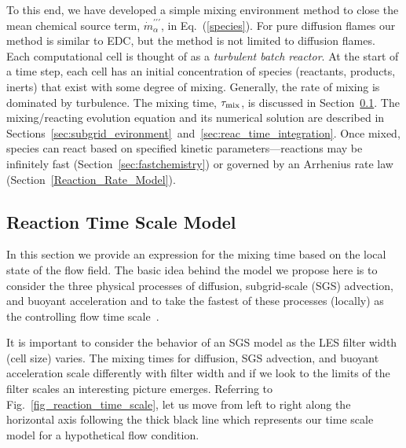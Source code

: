 To this end, we have developed a simple mixing environment method to close the mean chemical source term, $\dot{m}^{\prime\prime\prime}_{\alpha}$, in Eq.~(\ref{species}).  For pure diffusion flames our method is similar to EDC, but the method is not limited to diffusion flames.  Each computational cell is thought of as a {\em turbulent batch reactor}. At the start of a time step, each cell has an initial concentration of species (reactants, products, inerts) that exist with some degree of mixing. Generally, the rate of mixing is dominated by turbulence. The mixing time, $\tau_{\rm mix}$, is discussed in Section~\ref{sec:reac_time_scale}. The mixing/reacting evolution equation and its numerical solution are described in Sections~\ref{sec:subgrid_evironment}~and~\ref{sec:reac_time_integration}. Once mixed, species can react based on specified kinetic parameters---reactions may be infinitely fast (Section~\ref{sec:fastchemistry}) or governed by an Arrhenius rate law (Section~\ref{Reaction_Rate_Model}).


\subsection{Reaction Time Scale Model}
\label{sec:reac_time_scale}

In this section we provide an expression for the mixing time based on the local state of the flow field.  The basic idea behind the model we propose here is to consider the three physical processes of diffusion, subgrid-scale (SGS) advection, and buoyant acceleration and to take the fastest of these processes (locally) as the controlling flow time scale~\cite{McDermott:2011}.

It is important to consider the behavior of an SGS model as the LES filter width (cell size) varies. The mixing times for diffusion, SGS advection, and buoyant acceleration scale differently with filter width and if we look to the limits of the filter scales an interesting picture emerges.  Referring to Fig.~\ref{fig_reaction_time_scale}, let us move from left to right along the horizontal axis following the thick black line which represents our time scale model for a hypothetical flow condition.  

